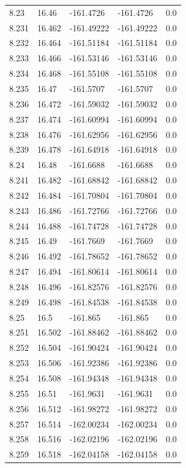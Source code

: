 \begin{tabular}{lllll}
8.23 & 16.46 & -161.4726 & -161.4726 & 0.0 \\
8.231 & 16.462 & -161.49222 & -161.49222 & 0.0 \\
8.232 & 16.464 & -161.51184 & -161.51184 & 0.0 \\
8.233 & 16.466 & -161.53146 & -161.53146 & 0.0 \\
8.234 & 16.468 & -161.55108 & -161.55108 & 0.0 \\
8.235 & 16.47 & -161.5707 & -161.5707 & 0.0 \\
8.236 & 16.472 & -161.59032 & -161.59032 & 0.0 \\
8.237 & 16.474 & -161.60994 & -161.60994 & 0.0 \\
8.238 & 16.476 & -161.62956 & -161.62956 & 0.0 \\
8.239 & 16.478 & -161.64918 & -161.64918 & 0.0 \\
8.24 & 16.48 & -161.6688 & -161.6688 & 0.0 \\
8.241 & 16.482 & -161.68842 & -161.68842 & 0.0 \\
8.242 & 16.484 & -161.70804 & -161.70804 & 0.0 \\
8.243 & 16.486 & -161.72766 & -161.72766 & 0.0 \\
8.244 & 16.488 & -161.74728 & -161.74728 & 0.0 \\
8.245 & 16.49 & -161.7669 & -161.7669 & 0.0 \\
8.246 & 16.492 & -161.78652 & -161.78652 & 0.0 \\
8.247 & 16.494 & -161.80614 & -161.80614 & 0.0 \\
8.248 & 16.496 & -161.82576 & -161.82576 & 0.0 \\
8.249 & 16.498 & -161.84538 & -161.84538 & 0.0 \\
8.25 & 16.5 & -161.865 & -161.865 & 0.0 \\
8.251 & 16.502 & -161.88462 & -161.88462 & 0.0 \\
8.252 & 16.504 & -161.90424 & -161.90424 & 0.0 \\
8.253 & 16.506 & -161.92386 & -161.92386 & 0.0 \\
8.254 & 16.508 & -161.94348 & -161.94348 & 0.0 \\
8.255 & 16.51 & -161.9631 & -161.9631 & 0.0 \\
8.256 & 16.512 & -161.98272 & -161.98272 & 0.0 \\
8.257 & 16.514 & -162.00234 & -162.00234 & 0.0 \\
8.258 & 16.516 & -162.02196 & -162.02196 & 0.0 \\
8.259 & 16.518 & -162.04158 & -162.04158 & 0.0 \\

\end{tabular}
